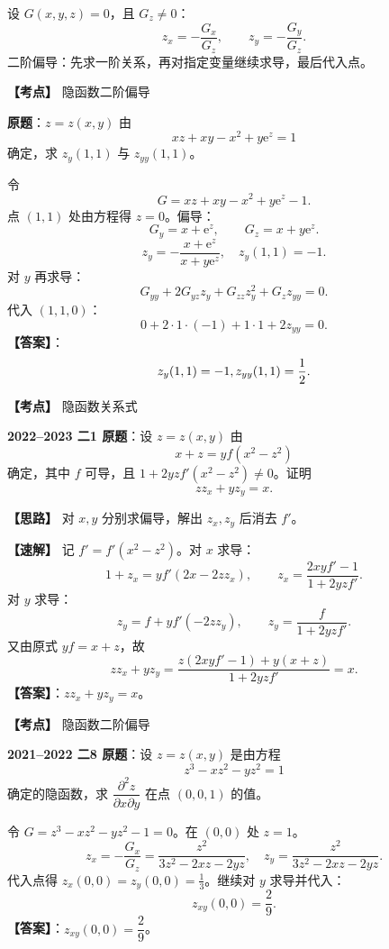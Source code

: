 ﻿\documentclass[11pt,a4paper,UTF8]{ctexart}
\newcommand{\ee}{\mathrm e}
\begin{document}
\begin{templatebox}[隐函数模板]
设 $G(x,y,z)=0$，且 $G_z\ne0$：
\[
z_x=-\frac{G_x}{G_z},\qquad z_y=-\frac{G_y}{G_z}.
\]
二阶偏导：先求一阶关系，再对指定变量继续求导，最后代入点。
\end{templatebox}

\begin{answerbox}[2020--2021 二-6]
\textbf{【考点】} 隐函数二阶偏导

\textbf{原题}：$z=z(x,y)$ 由
\[
xz+xy-x^2+y\ee^z=1
\]
确定，求 $z_y(1,1)$ 与 $z_{yy}(1,1)$。

令
\[
G=xz+xy-x^2+y\ee^z-1.
\]
点 $(1,1)$ 处由方程得 $z=0$。偏导：
\[
G_y=x+\ee^z,
\qquad G_z=x+y\ee^z.
\]
\[
z_y=-\frac{x+\ee^z}{x+y\ee^z},
\quad z_y(1,1)=-1.
\]
对 $y$ 再求导：
\[
G_{yy}+2G_{yz}z_y+G_{zz}z_y^2+G_z z_{yy}=0.
\]
代入 $(1,1,0)$：
\[
0+2\cdot1\cdot(-1)+1\cdot1+2z_{yy}=0.
\]
\textbf{【答案】}：
\[
z_y(1,1)=-1,\\ z_{yy}(1,1)=\frac12.
\]
\end{answerbox}

\begin{answerbox}[2022--2023 二-1]
\textbf{【考点】} 隐函数关系式

\textbf{2022--2023 二1 原题}：设 $z=z(x,y)$ 由
\[
x+z=yf(x^2-z^2)
\]
确定，其中 $f$ 可导，且 $1+2yzf'(x^2-z^2)\ne0$。证明
\[
zz_x+yz_y=x.
\]

\textbf{【思路】} 对 $x,y$ 分别求偏导，解出 $z_x,z_y$ 后消去 $f'$。

\textbf{【速解】} 记 $f'=f'(x^2-z^2)$。对 $x$ 求导：
\[
1+z_x=yf'(2x-2zz_x),
\qquad
z_x=\frac{2xyf'-1}{1+2yzf'}.
\]
对 $y$ 求导：
\[
z_y=f+yf'(-2zz_y),
\qquad
z_y=\frac{f}{1+2yzf'}.
\]
又由原式 $yf=x+z$，故
\[
zz_x+yz_y
=\frac{z(2xyf'-1)+y(x+z)}{1+2yzf'}=x.
\]
\textbf{【答案】}：$zz_x+yz_y=x$。

\end{answerbox}

\begin{answerbox}[2021--2022 二-8]
\textbf{【考点】} 隐函数二阶偏导

\textbf{2021--2022 二8 原题}：设 $z=z(x,y)$ 是由方程
\[
z^3-xz^2-yz^2=1
\]
确定的隐函数，求 $\dfrac{\partial^2 z}{\partial x\partial y}$ 在点 $(0,0,1)$ 的值。

令 $G=z^3-xz^2-yz^2-1=0$。在 $(0,0)$ 处 $z=1$。
\[
z_x=-\frac{G_x}{G_z}=\frac{z^2}{3z^2-2xz-2yz},
\quad
z_y=\frac{z^2}{3z^2-2xz-2yz}.
\]
代入点得 $z_x(0,0)=z_y(0,0)=\frac13$。继续对 $y$ 求导并代入：
\[
z_{xy}(0,0)=\frac29.
\]
\textbf{【答案】}：$z_{xy}(0,0)=\dfrac29$。

\end{answerbox}
\end{document}
